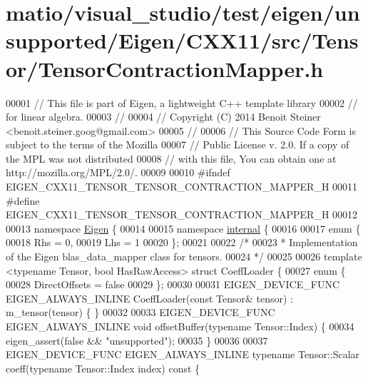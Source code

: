 \hypertarget{matio_2visual__studio_2test_2eigen_2unsupported_2_eigen_2_c_x_x11_2src_2_tensor_2_tensor_contraction_mapper_8h_source}{}\section{matio/visual\+\_\+studio/test/eigen/unsupported/\+Eigen/\+C\+X\+X11/src/\+Tensor/\+Tensor\+Contraction\+Mapper.h}
\label{matio_2visual__studio_2test_2eigen_2unsupported_2_eigen_2_c_x_x11_2src_2_tensor_2_tensor_contraction_mapper_8h_source}

\begin{DoxyCode}
00001 \textcolor{comment}{// This file is part of Eigen, a lightweight C++ template library}
00002 \textcolor{comment}{// for linear algebra.}
00003 \textcolor{comment}{//}
00004 \textcolor{comment}{// Copyright (C) 2014 Benoit Steiner <benoit.steiner.goog@gmail.com>}
00005 \textcolor{comment}{//}
00006 \textcolor{comment}{// This Source Code Form is subject to the terms of the Mozilla}
00007 \textcolor{comment}{// Public License v. 2.0. If a copy of the MPL was not distributed}
00008 \textcolor{comment}{// with this file, You can obtain one at http://mozilla.org/MPL/2.0/.}
00009 
00010 \textcolor{preprocessor}{#ifndef EIGEN\_CXX11\_TENSOR\_TENSOR\_CONTRACTION\_MAPPER\_H}
00011 \textcolor{preprocessor}{#define EIGEN\_CXX11\_TENSOR\_TENSOR\_CONTRACTION\_MAPPER\_H}
00012 
00013 \textcolor{keyword}{namespace }\hyperlink{namespace_eigen}{Eigen} \{
00014 
00015 \textcolor{keyword}{namespace }\hyperlink{namespaceinternal}{internal} \{
00016 
00017 \textcolor{keyword}{enum} \{
00018   Rhs = 0,
00019   Lhs = 1
00020 \};
00021 
00022 \textcolor{comment}{/*}
00023 \textcolor{comment}{ * Implementation of the Eigen blas\_data\_mapper class for tensors.}
00024 \textcolor{comment}{ */}
00025 
00026 \textcolor{keyword}{template} <\textcolor{keyword}{typename} Tensor, \textcolor{keywordtype}{bool} HasRawAccess> \textcolor{keyword}{struct }CoeffLoader \{
00027   \textcolor{keyword}{enum} \{
00028     DirectOffsets = \textcolor{keyword}{false}
00029   \};
00030 
00031   EIGEN\_DEVICE\_FUNC EIGEN\_ALWAYS\_INLINE CoeffLoader(\textcolor{keyword}{const} Tensor& tensor) : m\_tensor(tensor) \{ \}
00032 
00033   EIGEN\_DEVICE\_FUNC EIGEN\_ALWAYS\_INLINE \textcolor{keywordtype}{void} offsetBuffer(\textcolor{keyword}{typename} Tensor::Index) \{
00034     eigen\_assert(\textcolor{keyword}{false} && \textcolor{stringliteral}{"unsupported"});
00035   \}
00036 
00037   EIGEN\_DEVICE\_FUNC EIGEN\_ALWAYS\_INLINE \textcolor{keyword}{typename} Tensor::Scalar coeff(\textcolor{keyword}{typename} Tensor::Index index)\textcolor{keyword}{ const }\{

\end{DoxyCode}
